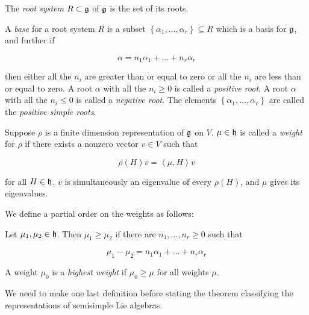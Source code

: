 The \emph{root system} $R \subset \mathfrak{g}$ of $\mathfrak{g}$ is the set of its roots. 

\begin{defn}
A \emph{base} for a root system $R$ is a subset $\left\{ \alpha_1, \ldots,
\alpha_r \right\} \subseteq R$ which is a basis for $\mathfrak{g}$, and further if 

\begin{equation}
\alpha = n_1 \alpha_1 + \ldots + n_r \alpha_r
\end{equation}

then either all the $n_i$ are greater than or equal to zero or all the $n_i$
are less than or equal to zero. A root $\alpha$ with all the $n_i \geq 0$ is
called a \emph{positive root}. A root $\alpha$ with all the $n_i \leq 0$ is
called a \emph{negative root}. The elements $\left\{ \alpha_1, \ldots, \alpha_r
\right\}$ are called the \emph{positive simple roots}.
\end{defn}

Suppose $\rho$ is a finite dimension representation of $\mathfrak{g}$ on $V$. $\mu \in \mathfrak{h}$ is called a \emph{weight} for $\rho$ if there exists a nonzero vector $v \in V$ such that 

\begin{equation}
\rho(H)v = \left<\mu, H\right> v
\end{equation}

for all $H \in \mathfrak{h}$. $v$ is simultaneously an eigenvalue of every $\rho(H)$,
and $\mu$ gives its eigenvalues.

We define a partial order on the weights as follows:

\begin{defn}
Let $\mu_1, \mu_2 \in \mathfrak{h}$. Then $\mu_1 \geq \mu_2$ if there are $n_1, \ldots, n_r \geq 0$ such that 

\begin{equation}
\mu_1 - \mu_2 = n_1 \alpha_1 + \ldots + n_r \alpha_r
\end{equation}

A weight $\mu_0$ is a \emph{highest weight} if $\mu_0 \geq \mu$ for all weights $\mu$.

\end{defn}

We need to make one last definition before stating the theorem classifying the representations of semisimple Lie algebras.

